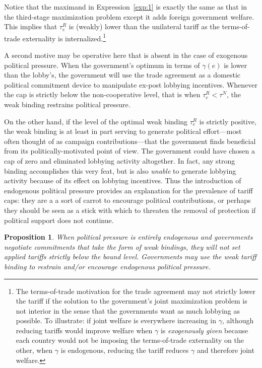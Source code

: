 \documentclass[12pt,titlepage]{article}
\newtheorem{proposition}{Proposition}
\newcommand{\ga}{\gamma}
\begin{document}
Notice that the maximand in Expression~\ref{exp:1} is exactly the same as that in the third-stage maximization problem except it adds  foreign government welfare. This implies that $\tau_e^R$ is (weakly) lower than the unilateral tariff as the terms-of-trade externality is internalized.\footnote{The terms-of-trade motivation for the trade agreement may not strictly lower the tariff if the solution to the government's joint maximization problem is not interior in the sense that the governments want as much lobbying as possible. To illustrate: if joint welfare is everywhere increasing in $\ga$, although reducing tariffs would improve welfare when $\ga$ is \textit{exogenously given} because each country would not be imposing the terms-of-trade externality on the other, when $\ga$ is endogenous, reducing the tariff reduces $\ga$ and therefore joint welfare.\label{fn:tot}}

A second motive may be operative here that is absent in the case of exogenous political pressure. When the government's optimum in terms of $\ga(e)$ is lower than the lobby's, the government will use the trade agreement as a domestic political commitment device to manipulate ex-post lobbying incentives. Whenever the cap is strictly below the non-cooperative level, that is when $\tau_e^R < \tau^N$, the weak binding restrains political pressure.

On the other hand, if the level of the optimal weak binding $\tau_e^R$ is strictly positive, the weak binding is at least in part serving to generate political effort---most often thought of as campaign contributions---that the government finds beneficial from its politically-motivated point of view. The government could have chosen a cap of zero and eliminated lobbying activity altogether. In fact, any strong binding accomplishes this very feat, but is also \textit{unable} to generate lobbying activity because of its effect on lobbying incentives. Thus the introduction of endogenous political pressure provides an explanation for the prevalence of tariff caps: they are a a sort of carrot to encourage political contributions, or perhaps they should be seen as a stick with which to threaten the removal of protection if political support does not continue.

\begin{proposition}
    When political pressure is entirely endogenous and governments negotiate commitments that take the form of weak bindings, they will not set applied tariffs strictly below the bound level. Governments may use the weak tariff binding to restrain and/or encourage endogenous political pressure.
		\label{res:weak}
\end{proposition}
\end{document}
